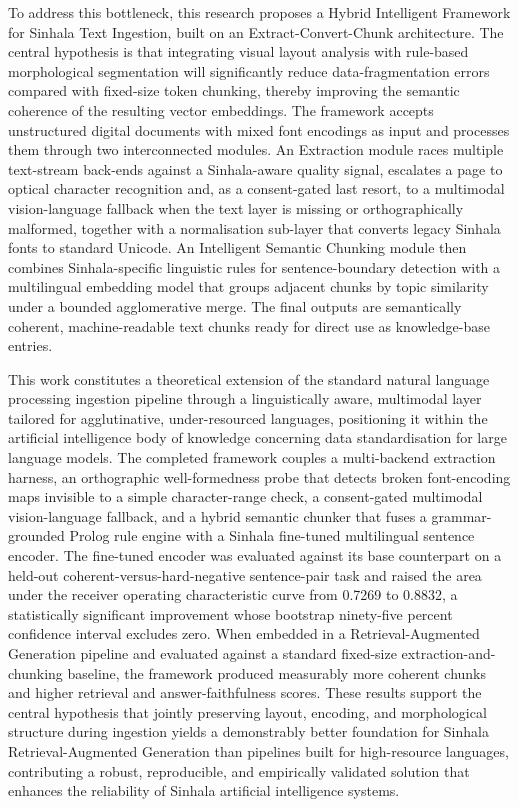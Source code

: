 \documentclass[12pt,a4paper,oneside]{report}
\begin{document}
To address this bottleneck, this research proposes a Hybrid Intelligent Framework for Sinhala Text Ingestion, built on an Extract-Convert-Chunk architecture. The central hypothesis is that integrating visual layout analysis with rule-based morphological segmentation will significantly reduce data-fragmentation errors compared with fixed-size token chunking, thereby improving the semantic coherence of the resulting vector embeddings. The framework accepts unstructured digital documents with mixed font encodings as input and processes them through two interconnected modules. An Extraction module races multiple text-stream back-ends against a Sinhala-aware quality signal, escalates a page to optical character recognition and, as a consent-gated last resort, to a multimodal vision-language fallback when the text layer is missing or orthographically malformed, together with a normalisation sub-layer that converts legacy Sinhala fonts to standard Unicode. An Intelligent Semantic Chunking module then combines Sinhala-specific linguistic rules for sentence-boundary detection with a multilingual embedding model that groups adjacent chunks by topic similarity under a bounded agglomerative merge. The final outputs are semantically coherent, machine-readable text chunks ready for direct use as knowledge-base entries.

This work constitutes a theoretical extension of the standard natural language processing ingestion pipeline through a linguistically aware, multimodal layer tailored for agglutinative, under-resourced languages, positioning it within the artificial intelligence body of knowledge concerning data standardisation for large language models. The completed framework couples a multi-backend extraction harness, an orthographic well-formedness probe that detects broken font-encoding maps invisible to a simple character-range check, a consent-gated multimodal vision-language fallback, and a hybrid semantic chunker that fuses a grammar-grounded Prolog rule engine with a Sinhala fine-tuned multilingual sentence encoder. The fine-tuned encoder was evaluated against its base counterpart on a held-out coherent-versus-hard-negative sentence-pair task and raised the area under the receiver operating characteristic curve from 0.7269 to 0.8832, a statistically significant improvement whose bootstrap ninety-five percent confidence interval excludes zero. When embedded in a Retrieval-Augmented Generation pipeline and evaluated against a standard fixed-size extraction-and-chunking baseline, the framework produced measurably more coherent chunks and higher retrieval and answer-faithfulness scores. These results support the central hypothesis that jointly preserving layout, encoding, and morphological structure during ingestion yields a demonstrably better foundation for Sinhala Retrieval-Augmented Generation than pipelines built for high-resource languages, contributing a robust, reproducible, and empirically validated solution that enhances the reliability of Sinhala artificial intelligence systems.
\end{document}
